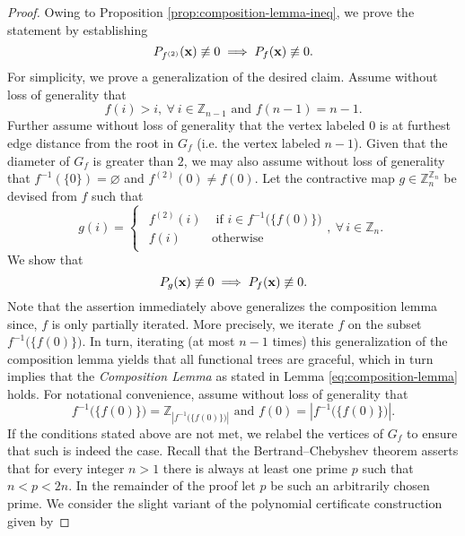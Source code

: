 \begin{proof}
Owing to Proposition \ref{prop:composition-lemma-ineq}, we prove the statement by establishing 
\[
    P_{f^{(2)}} ({\bf x}) \not\equiv 0  \implies  P_{f} ({\bf x}) \not\equiv 0.
\]
For simplicity, we prove a generalization of the desired claim. Assume without loss of generality that
\[
f(i)>i,\ \forall\:i\in\mathbb{Z}_{n-1}\text{  and  }f(n-1)=n-1.
\]
Further assume without loss of generality that the vertex labeled $0$ is at furthest edge distance from the root in $G_f$ (i.e. the vertex labeled $n-1$). Given that the diameter of $G_{f}$ is greater than $2$, we may also assume without loss of generality that  $f^{-1}\left(\{0\}\right)=\varnothing$
and $f^{(2)}(0)\ne f(0)$. Let the contractive
map $g\in\mathbb{Z}_{n}^{\mathbb{Z}_{n}}$ be devised from $f$ such that 
\begin{equation}
g(i)=\begin{cases}
\begin{array}{cc}
f^{(2)}(i) & \text{ if }i\in f^{-1}\big(\{f(0)\}\big)\\
f(i) & \text{otherwise}
\end{array},\ \forall\,i\in\mathbb{Z}_{n}.\end{cases}
\end{equation}
We show that
\begin{equation} \label{eq:composition-lemma-generalized}
P_{g} ({\bf x}) \not\equiv 0  \implies  P_{f} ({\bf x}) \not\equiv 0.
\end{equation}
Note that the assertion immediately above generalizes the composition
lemma since, $f$ is only partially
iterated. More precisely, we iterate $f$ on the subset $f^{-1}\big(\{f(0)\}\big)$.
In turn, iterating (at most $n-1$ times) this generalization  of the composition lemma yields
that all functional trees are graceful, which in turn implies that the \textit{Composition Lemma} as stated in Lemma \ref{eq:composition-lemma}  holds. For notational convenience, assume without loss of generality that 
\begin{equation}
f^{-1}\big(\{f(0)\}\big)=\mathbb{Z}_{\left|f^{-1}\big(\{f(0)\}\big)\right|}\text{  and  }f(0)=\left|f^{-1}\big(\{f(0)\}\big)\right|.
\end{equation}
If the conditions stated above are not met, we relabel the vertices of $G_f$ to ensure that such is indeed the case. Recall that the Bertrand–Chebyshev theorem asserts that for every integer $n>1$  there is always at least one prime $p$ such that $n < p < 2n.$ In the remainder of the proof let $p$ be such an arbitrarily chosen prime. We consider the slight variant of the polynomial certificate construction given by

\end{proof}

